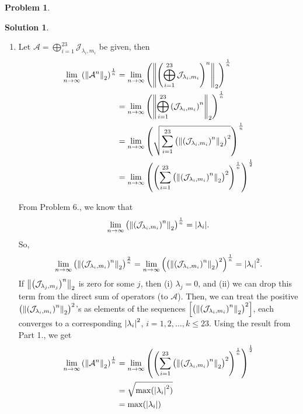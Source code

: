 \documentclass{article}
\theoremstyle{definition}
\newtheorem*{prob*}{Problem}
\newtheorem*{sln*}{Solution}
\newcommand{\A}{\mathcal{A}}
\newcommand{\jor}{\mathcal{J}}
\begin{document}
\begin{prob*}
\begin{sln*}
\begin{enumerate}
		
		
		
		
			\item Let $\A= \bigoplus^{23}_{i=1} \jor_{\lambda_i, m_i}$ be given, then 
			\begin{align*}
			\lim\limits_{n\to\infty}\left( \norm{\A^n}_2 \right)^{\frac{1}{n}} &= \lim\limits_{n\to\infty}\left( \norm{\left(\bigoplus^{23}_{i=1} \jor_{\lambda_i, m_i}\right)^n}_2 \right)^{\frac{1}{n}}\\
			&= \lim\limits_{n\to\infty}\left( \norm{\bigoplus^{23}_{i=1}\left( \jor_{\lambda_i, m_i}\right)^n}_2 \right)^{\frac{1}{n}}\\
			&= \lim\limits_{n\to\infty}\left( \sqrt{\sum^{23}_{i=1}\left( \norm{\left( \jor_{\lambda_i, m_i}\right)^n}_2\right)^2} \right)^{\frac{1}{n}}\\
			&= \lim\limits_{n\to\infty}\left( \left( \sum^{23}_{i=1}\left( \norm{\left( \jor_{\lambda_i, m_i}\right)^n}_2\right)^2 \right)^\frac{1}{n}\right)^{\frac{1}{2}}
			\end{align*}
			
			
			
			From Problem 6., we know that
			\begin{align*}
			\lim\limits_{n\to\infty} \left(  \norm{\left(\jor_{\lambda_i,m_i}\right)^n}_2 \right)^{\frac{1}{n}}  =  \abs{\lambda_i}.
			\end{align*}
			So,
			\begin{align*}
			\lim\limits_{n\to\infty} \left(  \norm{\left(\jor_{\lambda_i,m_i}\right)^n}_2 \right)^{\frac{2}{n}}  = \lim\limits_{n\to\infty} \left(\left(  \norm{\left(\jor_{\lambda_i,m_i}\right)^n}_2 \right)^2\right)^{\frac{1}{n}}  =   \abs{\lambda_i}^2.
			\end{align*}
			If $\norm{\left(\jor_{\lambda_j,m_j}\right)^n}_2$ is zero for some $j$, then (i) $\lambda_j = 0$, and (ii) we can drop this term from the direct sum of operators (to $\A$). Then, we can treat the positive $\left(\norm{\left(\jor_{\lambda_i,m_i}\right)^n}_2\right)^2$'s as elements of the sequences $\left[\left(\norm{\left(\jor_{\lambda_i,m_i}\right)^n}_2\right)^2\right]$, each converges to a corresponding $\abs{\lambda_i}^2$, $i=1,2,\dots,k \leq 23$. Using the result from Part 1., we get
			\begin{align*}
			\lim\limits_{n\to\infty}\left( \norm{\A^n}_2 \right)^{\frac{1}{n}}
			&= \lim\limits_{n\to\infty}\left( \left( \sum^{23}_{i=1}\left( \norm{\left( \jor_{\lambda_i, m_i}\right)^n}_2\right)^2 \right)^\frac{1}{n}\right)^{\frac{1}{2}}\\
			&= \sqrt{\max(\abs{\lambda_i}^2)}\\
			&= \max(\abs{\lambda_i})
			\end{align*}
			
			
			
			
		\end{enumerate}
	\end{sln*}
\end{prob*}
\end{document}
